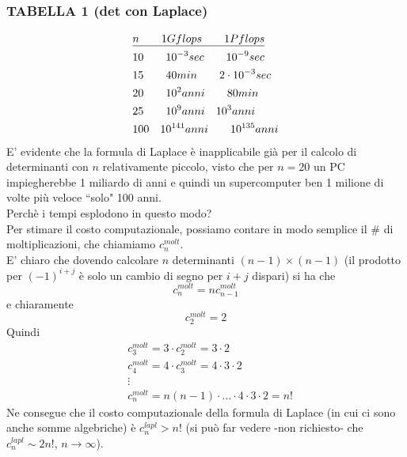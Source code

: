 \documentclass[12pt,a4paper]{article}
\begin{document}
\subsubsection{TABELLA 1 (det con Laplace)}
\[ \begin{split}
	& \uline{n\quad\quad 1Gflops\quad\quad 1Pflops}\\
	&  10\quad\quad 10^{-3}sec\quad\quad 10^{-9}sec\\
	&  15\quad\quad 40min\quad\quad 2\cdot10^{-3}sec\\
	& 20\quad\quad 10^{2}anni\quad\quad 80min\\
	& 25\quad\quad 10^{9}anni\quad 10^{3}anni\\
	& 100\quad 10^{141}anni\quad\quad 10^{135}anni\\ 
\end{split} \]
E' evidente che la formula di Laplace è inapplicabile già per il calcolo di determinanti con $n$ relativamente piccolo, visto che per $n=20$ un PC impiegherebbe 1 miliardo di anni e quindi un supercomputer ben 1 milione di volte più veloce ``solo" 100 anni.\\Perchè i tempi esplodono in questo modo?\\Per stimare il costo computazionale, possiamo contare in modo semplice il \# di moltiplicazioni, che chiamiamo $c_n^{molt}$.\\
E' chiaro che dovendo calcolare $n$ determinanti $(n-1)\times (n-1)$ (il prodotto per $(-1)^{i+j}$ è solo un cambio di segno per $i+j$ dispari) si ha che 
\begin{equation*}
    c_n^{molt} = n c_{n-1}^{molt}
\end{equation*}
e chiaramente
\begin{equation*}
    c_2^{molt} = 2
\end{equation*}
Quindi
\begin{equation*}
    \begin{split}
        & c_3^{molt} = 3 \cdot c_2^{molt} = 3\cdot 2 \\
        & c_4^{molt} = 4 \cdot c_3^{molt} = 4\cdot 3\cdot 2 \\
        & \vdots \\
        & c_n^{molt} = n(n-1)\cdot ... \cdot 4\cdot 3\cdot 2 = n!
    \end{split}
\end{equation*}
Ne consegue che il costo computazionale della formula di Laplace (in cui ci sono anche somme algebriche) è $c_n^{lapl} > n!$ (si può far vedere -non richiesto- che $c_n^{lapl} \sim 2n!$, $n \to \infty$). \\
\end{document}

